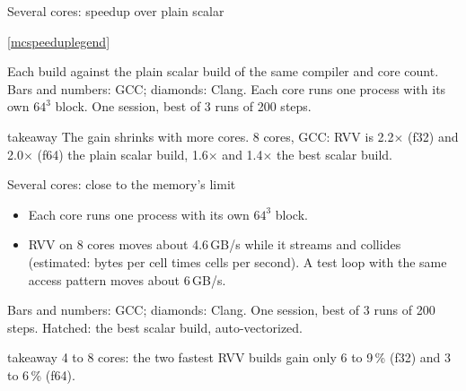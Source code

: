 \documentclass[aspectratio=169,10pt,t]{beamer}
\newcommand{\sx}[1]{#1\ensuremath{\times}} %
\newcommand{\takeaway}[1]{\par\vfill
  \begin{beamercolorbox}[wd=\textwidth,sep=4pt,rounded=true]{takeaway}
    \small #1
  \end{beamercolorbox}}
\begin{document}
\begin{frame}{Several cores: speedup over plain scalar}
  \vspace{1mm}
  \centering\hspace{0.6cm}

  \vspace{0.5mm}
  \ref{mcspeeduplegend}

  \vspace{1mm}
  {\scriptsize\color{psgray}Each build against the plain scalar build of the same compiler and core
  count. Bars and numbers: GCC; diamonds: Clang. Each core runs one process with its own $64^3$ block.
  One session, best of 3 runs of 200 steps.\par}
  \takeaway{The gain shrinks with more cores. 8 cores, GCC: RVV is \sx{2.2} (f32) and \sx{2.0}
    (f64) the plain scalar build, \sx{1.6} and \sx{1.4} the best scalar build.}
\end{frame}

\begin{frame}{Several cores: close to the memory's limit}
  \vspace{1mm}
  \centering

  \vspace{1mm}
  \raggedright
  \begin{itemize}\small
    \item Each core runs one process with its own $64^3$ block.
    \item RVV on 8 cores moves about 4.6\,GB/s while it streams and collides (estimated: bytes per cell
          times cells per second). A test loop with the same access pattern moves about 6\,GB/s.
  \end{itemize}
  {\scriptsize\color{psgray}Bars and numbers: GCC; diamonds: Clang. One session, best of 3 runs of
  200 steps. Hatched: the best scalar build, auto-vectorized.\par}
  \takeaway{4 to 8 cores: the two fastest RVV builds gain only 6 to 9\,\% (f32) and 3 to 6\,\% (f64).}
\end{frame}
\end{document}
